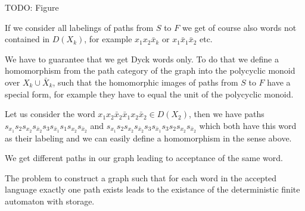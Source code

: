 TODO: Figure
\begin{figure}

\end{figure}

If we consider all labelings of paths from $S$ to $F$ we get of course also
words not contained in $D(X_k)$, for example $x_1 x_2 \bar{x}_k$ or $x_1
\bar{x}_1 \bar{x}_2$ etc.

We have to guarantee that we get Dyck words only. To do that we define a
homomorphism from the path category of the graph into the polycyclic monoid over
$X_k \cup \bar{X}_k$, such that the homomorphic images of paths from $S$ to
$F$ have a special form, for example they have to equal the unit of the
polycyclic monoid.

Let us consider the word $x_1 x_2 \bar{x}_2 \bar{x}_1 x_2 \bar{x}_2 \in D(X_2)$,
then we have paths $s_{x_1} s_2 s_{x_2} s_{\bar{x}_2} s_3 s_{\bar{x}_1} s_1
s_{x_2} s_{\bar{x}_2} $ and $s_{x_1} s_2 s_{x_2} s_{\bar{x}_2} s_3
s_{\bar{x}_1} s_3 s_2 s_{x_2} s_{\bar{x}_2}$ which both have this word as their
labeling and we can easily define a homomorphism in the sense above.

We get different paths in our graph leading to acceptance of the same word.

The problem to construct a graph such that for each word in the accepted
language exactly one path exists leads to the existance of the deterministic
finite automaton with storage.









